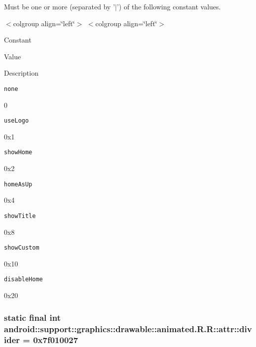 Must be one or more (separated by '$|$') of the following constant values. \begin{TabularC}{0}
\hline
\end{TabularC}
$<$colgroup align=\char`\"{}left\char`\"{}$>$ $<$colgroup align=\char`\"{}left\char`\"{}$>$ 

Constant

Value

Description 

{\tt none}

0

{\tt useLogo}

0x1

{\tt showHome}

0x2

{\tt homeAsUp}

0x4

{\tt showTitle}

0x8

{\tt showCustom}

0x10

{\tt disableHome}

0x20\hypertarget{classandroid_1_1support_1_1graphics_1_1drawable_1_1animated_1_1_r_1_1attr_27f74756e16d4eb788afddff585b6283}{
\subsubsection[{divider}]{\setlength{\rightskip}{0pt plus 5cm}static final int android::support::graphics::drawable::animated.R.R::attr::divider = 0x7f010027}}
\label{classandroid_1_1support_1_1graphics_1_1drawable_1_1animated_1_1_r_1_1attr_27f74756e16d4eb788afddff585b6283}


